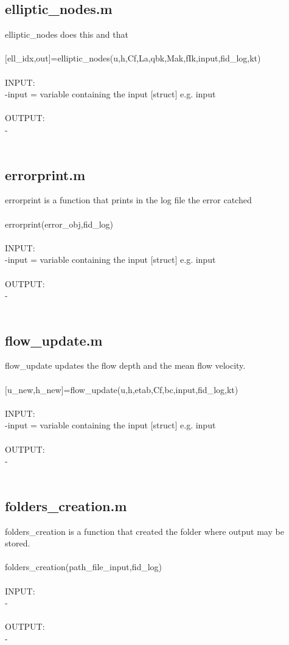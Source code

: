 \subsection{elliptic\_nodes.m}
elliptic\_nodes does this and that \\ 
 \\ 
$[$ell\_idx,out$]$=elliptic\_nodes(u,h,Cf,La,qbk,Mak,fIk,input,fid\_log,kt) \\ 
 \\ 
INPUT: \\ 
   -input = variable containing the input $[$struct$]$ e.g. input \\ 
 \\ 
OUTPUT: \\ 
   - \\ 
 \\ 
\subsection{errorprint.m}
errorprint is a function that prints in the log file the error catched \\ 
 \\ 
errorprint(error\_obj,fid\_log) \\ 
 \\ 
INPUT: \\ 
   -input = variable containing the input $[$struct$]$ e.g. input \\ 
 \\ 
OUTPUT: \\ 
   - \\ 
 \\ 
\subsection{flow\_update.m}
flow\_update updates the flow depth and the mean flow velocity. \\ 
 \\ 
$[$u\_new,h\_new$]$=flow\_update(u,h,etab,Cf,bc,input,fid\_log,kt) \\ 
 \\ 
INPUT: \\ 
   -input = variable containing the input $[$struct$]$ e.g. input \\ 
 \\ 
OUTPUT: \\ 
   - \\ 
 \\ 
\subsection{folders\_creation.m}
folders\_creation is a function that created the folder where output may be stored. \\ 
 \\ 
folders\_creation(path\_file\_input,fid\_log) \\ 
 \\ 
INPUT: \\ 
   - \\ 
 \\ 
OUTPUT: \\ 
   - \\ 
 \\ 

